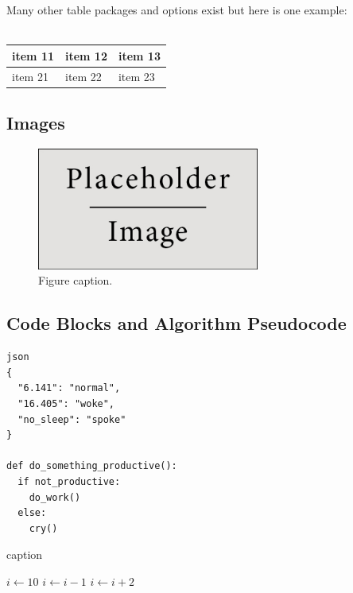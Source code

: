 \documentclass{article}
\begin{document}
Many other table packages and options exist but here is one example:\\\\

\begin{tabularx}{0.8\textwidth} {
  | >{\raggedright\arraybackslash}X
  | >{\centering\arraybackslash}X
  | >{\raggedleft\arraybackslash}X | }
 \hline
 item 11 & item 12 & item 13 \\
 \hline
 item 21  & item 22  & item 23  \\
\hline
\end{tabularx}

\subsection{Images}

\begin{figure}[h]
\begin{center}
\includegraphics[width=0.65\textwidth]{placeholder} %
\caption{Figure caption.}
\end{center}
\end{figure}

\subsection{Code Blocks and Algorithm Pseudocode}


\begin{lstlisting}
json
{
  "6.141": "normal",
  "16.405": "woke",
  "no_sleep": "spoke"
}

def do_something_productive():
  if not_productive:
    do_work()
  else:
    cry()
\end{lstlisting}


\begin{algorithm}[H]
\SetAlgoLined
 \caption{caption}
\end{algorithm}


\begin{algorithmic}
\STATE $i\gets 10$
        \STATE $i\gets i-1$
\ELSE
                \STATE $i\gets i+2$
        \ENDIF
\ENDIF
\end{algorithmic}
\end{document}
